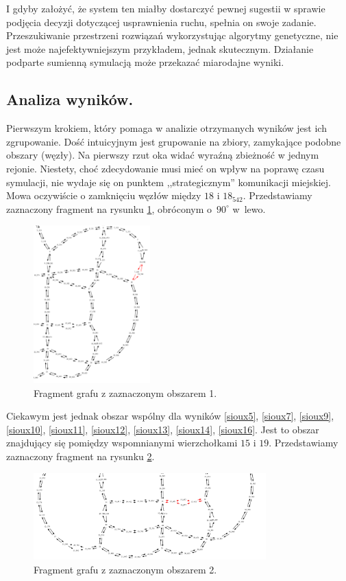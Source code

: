 \documentclass[twoside,12pt]{report}
\begin{document}
I gdyby założyć, że system ten miałby dostarczyć pewnej sugestii w sprawie podjęcia decyzji dotyczącej usprawnienia ruchu, spełnia on swoje zadanie. Przeszukiwanie przestrzeni rozwiązań wykorzystując algorytmy genetyczne, nie jest może najefektywniejszym przykładem, jednak skutecznym. Działanie podparte sumienną symulacją może przekazać miarodajne wyniki.

\subsection{Analiza wyników.}
Pierwszym krokiem, który pomaga w analizie otrzymanych wyników jest ich zgrupowanie. Dość intuicyjnym jest grupowanie na zbiory, zamykające podobne obszary (węzły). Na pierwszy rzut oka widać wyraźną zbieżność w jednym rejonie. Niestety, choć zdecydowanie musi mieć on wpływ na poprawę czasu symulacji, nie wydaje się on punktem ,,strategicznym'' komunikacji miejskiej. Mowa oczywiście o zamknięciu węzłów między $18$ i $18_542$. Przedstawiamy zaznaczony fragment na rysunku \ref{frag_1}, obróconym o~$90^{\circ}$ w~lewo.

\begin{figure}[ht]
\centering
\includegraphics[width=0.4\textwidth, angle=90]{img/sioux-out/obszar1}
\caption{Fragment grafu z zaznaczonym obszarem 1.}
\label{frag_1}
\end{figure}

Ciekawym jest jednak obszar wspólny dla wyników \ref{sioux5}, \ref{sioux7}, \ref{sioux9}, \ref{sioux10}, \ref{sioux11}, \ref{sioux12}, \ref{sioux13}, \ref{sioux14}, \ref{sioux16}. Jest to obszar znajdujący się pomiędzy wspomnianymi wierzchołkami $15$ i $19$. Przedstawiamy zaznaczony fragment na rysunku \ref{frag_2}.

\begin{figure}[ht]
\centering
\includegraphics[width=0.80\textwidth]{img/sioux-out/obszar2}
\caption{Fragment grafu z zaznaczonym obszarem 2.}
\label{frag_2}
\end{figure}
\end{document}
